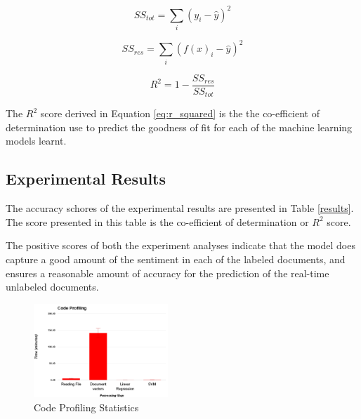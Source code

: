 \documentclass[conference]{IEEEtran}
\begin{document}
        \begin{equation}
        \displaystyle SS_{tot} = \sum_{i} (y_i - \hat{y})^2
        \end{equation}

        \begin{equation}
        \displaystyle SS_{res} = \sum_{i} (f(x)_i - \hat{y})^2
        \end{equation}

        \begin{equation} \label{eq:r_squared}
        \displaystyle R^2 = 1 - \frac{SS_{res}}{SS_{tot}}
        \end{equation}

    The $R^2$ score derived in Equation \ref{eq:r_squared} is the the co-efficient of determination use to predict the goodness of fit for each of the machine learning models learnt.


    \subsection{Experimental Results}

    The accuracy schores of the experimental results are presented in Table \ref{results}. The score presented in this table is the co-efficient of determination or $R^2$ score.

    \begin{table}[ht] \caption{Evaluation results} \label{results}
        \centering
    \end{table}

    The positive scores of both the experiment analyses indicate that the model does capture a good amount of the sentiment in each of the labeled documents, and ensures a reasonable amount of accuracy for the prediction of the real-time unlabeled documents.

    \begin{figure}[h]
        \centering
        \includegraphics[width=0.45\textwidth]{images/code_profiling.png}
        \caption{Code Profiling Statistics}
        \label{fig:code-profiling}
    \end{figure}
\end{document}
